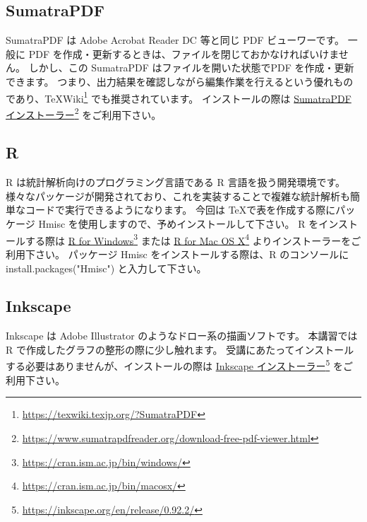 \subsection*{SumatraPDF}
SumatraPDF は Adobe Acrobat Reader DC 等と同じ PDF ビューワーです。
一般に PDF を作成・更新するときは、ファイルを閉じておかなければいけません。
しかし、この SumatraPDF はファイルを開いた状態でPDF を作成・更新できます。
つまり、出力結果を確認しながら編集作業を行えるという優れものであり、\TeX Wiki\footnote{\url{https://texwiki.texjp.org/?SumatraPDF}} でも推奨されています。
インストールの際は \href{https://www.sumatrapdfreader.org/download-free-pdf-viewer.html}{SumatraPDF インストーラー}\footnote{\url{https://www.sumatrapdfreader.org/download-free-pdf-viewer.html}} をご利用下さい。
\subsection*{R}
R は統計解析向けのプログラミング言語である R 言語を扱う開発環境です。
様々なパッケージが開発されており、これを実装することで複雑な統計解析も簡単なコードで実行できるようになります。
今回は \TeX で表を作成する際にパッケージ Hmisc を使用しますので、予めインストールして下さい。
R をインストールする際は \href{https://cran.ism.ac.jp/bin/windows/}{R for Windows}\footnote{\url{https://cran.ism.ac.jp/bin/windows/}} または \href{https://cran.ism.ac.jp/bin/macosx/}{R for Mac OS X}\footnote{\url{https://cran.ism.ac.jp/bin/macosx/}} よりインストーラーをご利用下さい。
パッケージ Hmisc をインストールする際は、R のコンソールに install.packages("Hmisc") と入力して下さい。





\subsection*{Inkscape}
Inkscape は Adobe Illustrator のようなドロー系の描画ソフトです。
本講習では R で作成したグラフの整形の際に少し触れます。
受講にあたってインストールする必要はありませんが、インストールの際は \href{https://inkscape.org/en/release/0.92.2/}{Inkscape インストーラー}\footnote{\url{https://inkscape.org/en/release/0.92.2/}} をご利用下さい。


















